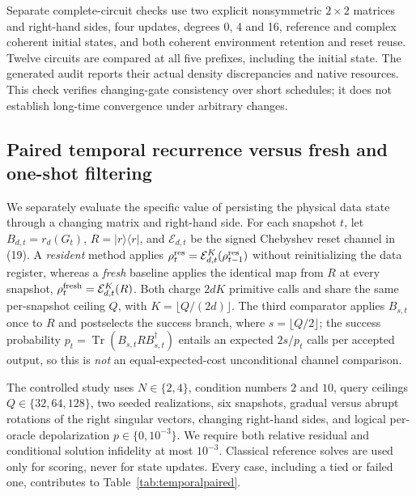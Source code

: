 \documentclass{ieeeaccess}
\newcommand{\ket}[1]{\lvert #1\rangle}\newcommand{\bra}[1]{\langle #1\rvert}
\newcommand{\Tr}{\operatorname{Tr}}\newcommand{\E}{\mathcal E}
\begin{document}
Separate complete-circuit checks use two explicit nonsymmetric $2\times2$ matrices and right-hand sides, four updates, degrees 0, 4 and 16, reference and complex coherent initial states, and both coherent environment retention and reset reuse. Twelve circuits are compared at all five prefixes, including the initial state. The generated audit reports their actual density discrepancies and native resources. This check verifies changing-gate consistency over short schedules; it does not establish long-time convergence under arbitrary changes.


\subsection{Paired temporal recurrence versus fresh and one-shot filtering}
\label{sec:matchedtemporal}
We separately evaluate the specific value of persisting the physical data
state through a changing matrix and right-hand side. For each snapshot $t$,
let $B_{d,t}=r_d(G_t)$, $R=\ket r\bra r$, and $\E_{d,t}$ be the signed
Chebyshev reset channel in (19). A \emph{resident} method applies
$\rho_t^{\rm res}=\E_{d,t}^{K}(\rho_{t-1}^{\rm res})$ without
reinitializing the data register, whereas a \emph{fresh} baseline applies
the identical map from $R$ at every snapshot,
$\rho_t^{\rm fresh}=\E_{d,t}^{K}(R)$.
Both charge $2dK$ primitive calls and share the same per-snapshot
ceiling $Q$, with $K=\lfloor Q/(2d)\rfloor$.
The third comparator applies $B_{s,t}$ once to $R$ and postselects the
success branch, where $s=\lfloor Q/2\rfloor$; the success probability
$p_t=\Tr(B_{s,t} R B_{s,t}^{\dagger})$ entails
an expected $2s/p_t$ calls per accepted output, so this is \emph{not}
an equal-expected-cost unconditional channel comparison.

The controlled study uses $N\in\{2,4\}$, condition numbers $2$ and $10$,
query ceilings $Q\in\{32,64,128\}$, two seeded realizations,
six snapshots, gradual versus abrupt rotations of the right singular
vectors, changing right-hand sides, and logical per-oracle depolarization
$p\in\{0,10^{-3}\}$. We require both relative residual and conditional
solution infidelity at most $10^{-3}$. Classical reference solves are used
only for scoring, never for state updates. Every case, including a tied or
failed one, contributes to Table~\ref{tab:temporalpaired}.
\end{document}
